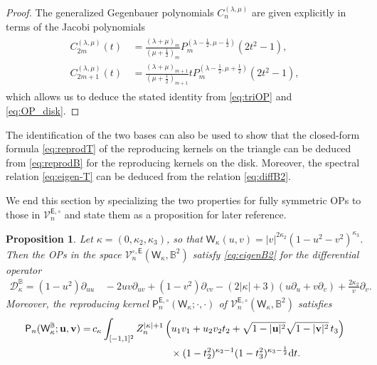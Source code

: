 \documentclass{amsart}
\newtheorem{prop}[thm]{Proposition}
\theoremstyle{remark}
\def\d{\mathrm{d}}
\def\sE{{\mathsf E}}
\def\sP{{\mathsf P}}
\def\sW{{\mathsf W}}
\def\k{{\kappa}}
\def\l{{\lambda}}
\def\ub{{\mathbf u}}
\def\vb{{\mathbf v}}
\def\CD{{\mathcal D}}
\def\CV{{\mathcal V}}
\def\BB{{\mathbb B}}
\def\f{\frac}
\begin{document}
\begin{proof}
The generalized Gegenbauer polynomials $C_n^{(\l,\mu)}$ are given explicitly in terms of the Jacobi polynomials 
\cite[Section 1.5.2]{DX}  
\begin{align} \label{eq:gGegen}
\begin{split}
C_{2m}^{(\l,\mu)}(t) &\, = \frac{(\l+\mu)_m}{(\mu+\f12)_m} P_m^{(\l-\f12,\mu-\f12)}(2 t^2 -1),\\
C_{2m+1}^{(\l,\mu)}(t) &\, = \frac{(\l+\mu)_{m+1}}{(\mu+\f12)_{m+1}} t P_m^{(\l-\f12,\mu+\f12)}(2 t^2 -1),
\end{split}
\end{align}
which allows us to deduce the stated identity from \eqref{eq:triOP} and \eqref{eq:OP_disk}. 
\end{proof}

The identification of the two bases can also be used to show that the closed-form formula \eqref{eq:reprodT} of the
reproducing kernels on the triangle can be deduced from \eqref{eq:reprodB} for the reproducing kernels on the disk. 
Moreover, the spectral relation \eqref{eq:eigen-T} can be deduced from the relation \eqref{eq:diffB2}. 

We end this section by specializing the two properties for fully symmetric OPs to those in $\CV_n^{\sE,\circ}$ 
and state them as a proposition for later reference. 

\begin{prop}
Let $\k = (0, \k_2 ,\k_3)$, so that $\sW_\k (u,v) = |v|^{2\k_2} \left(1-u^2-v^2\right)^{\k_3}$. Then the OPs in the space 
$\CV_n^{\circ,\sE}(\sW_\k, \BB^2)$ satisfy \eqref{eq:eigenB2} for the differential operator
\begin{align}\label{eq:diffB2E}
  \CD_\k^\BB =  (1-u^2)\partial_{uu}  &\, - 2 u v \partial_{uv} + (1-v^2)\partial_{vv} - (2 |\k| + 3) (u \partial_u + v \partial_v) 
  +  \frac {2 \k_2 } v \partial_v.
\end{align}
Moreover, the reproducing kernel $\sP_n^{\sE,\circ}(\sW_\k; \cdot,\cdot)$ of $\CV_n^{\sE,\circ}(\sW_\k, \BB^2)$ satisfies 
\begin{align} \label{eq:reprodBE}
\sP_n(\sW_\k^\BB; \ub,\vb) = &\, c_\k \int_{[-1,1]^2} Z_n^{|\k|+1} \left(u_1 v_1+ u_2 v_2 t_2  + 
  \sqrt{1-|\ub|^2} \sqrt{1-|\vb|^2}\, t_3 \right) \\
 &\qquad\qquad\qquad\qquad  \times (1-t_2^2)^{\k_2-1} (1-t_3^2)^{\k_3-\f12}\d t. \notag
\end{align}
\end{prop} 
\end{document}
